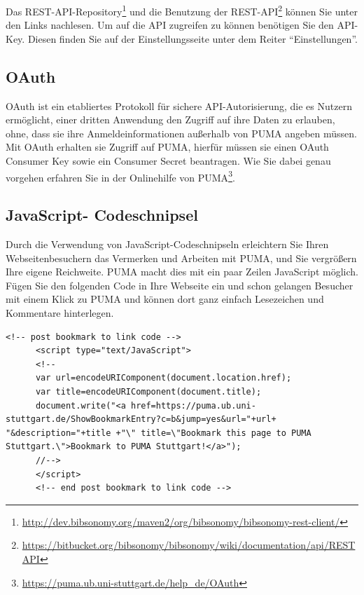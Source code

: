 Das REST-API-Repository\footnote{\url{http://dev.bibsonomy.org/maven2/org/bibsonomy/bibsonomy-rest-client/}} und die Benutzung der REST-API\footnote{\url{https://bitbucket.org/bibsonomy/bibsonomy/wiki/documentation/api/REST API}} können Sie unter den Links nachlesen.
\newline
Um auf die API zugreifen zu können benötigen Sie den API-Key. Diesen finden Sie auf der Einstellungsseite unter dem Reiter \enquote{Einstellungen}. 






\subsection{OAuth}
OAuth ist ein etabliertes Protokoll für sichere API-Autorisierung, die es Nutzern ermöglicht, einer dritten Anwendung den Zugriff auf ihre Daten zu erlauben, ohne, dass sie ihre Anmeldeinformationen außerhalb von PUMA angeben müssen. Mit OAuth erhalten sie Zugriff auf PUMA, hierfür müssen sie einen OAuth Consumer Key sowie ein Consumer Secret beantragen. Wie Sie dabei genau vorgehen erfahren Sie in der Onlinehilfe von PUMA\footnote{\url{https://puma.ub.uni-stuttgart.de/help_de/OAuth}}.



\subsection{JavaScript- Codeschnipsel}
Durch die Verwendung von JavaScript-Codeschnipseln erleichtern Sie Ihren Webseitenbesuchern das Vermerken und Arbeiten mit PUMA, und Sie vergrößern Ihre eigene Reichweite. PUMA macht dies mit ein paar Zeilen JavaScript möglich. Fügen Sie den folgenden Code in Ihre Webseite ein und schon gelangen Besucher mit einem Klick zu PUMA und können dort ganz einfach Lesezeichen und Kommentare hinterlegen.
\newline
\newline
\begin{lstlisting} 
<!-- post bookmark to link code -->
      <script type="text/JavaScript">
      <!--
      var url=encodeURIComponent(document.location.href);
      var title=encodeURIComponent(document.title);
      document.write("<a href=https://puma.ub.uni-stuttgart.de/ShowBookmarkEntry?c=b&jump=yes&url="+url+ "&description="+title +"\" title=\"Bookmark this page to PUMA Stuttgart.\">Bookmark to PUMA Stuttgart!</a>");
      //-->
      </script>
      <!-- end post bookmark to link code -->
\end{lstlisting}
